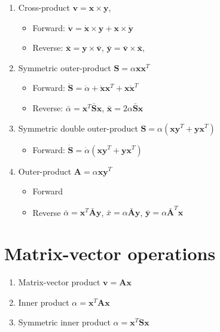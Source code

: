 \documentclass{article}
\begin{document}
\begin{enumerate}
\item Cross-product $\mathbf{v} = \mathbf{x} \times \mathbf{y}$,
\begin{itemize}
\item Forward: $\dot{\mathbf{v}} = \dot{\mathbf{x}} \times \mathbf{y} + \mathbf{x} \times \dot{\mathbf{y}}$
\item Reverse: $\bar{\mathbf{x}} = \mathbf{y} \times \bar{\mathbf{v}}$, $\bar{\mathbf{y}} = \bar{\mathbf{v}} \times \bar{\mathbf{x}}$,
\end{itemize}

\item Symmetric outer-product $\mathbf{S} = \alpha \mathbf{x}\mathbf{x}^{T}$
\begin{itemize}
\item Forward: $\dot{\mathbf{S}} = \dot{\alpha} + \dot{\mathbf{x}} \mathbf{x}^{T} + \mathbf{x} \dot{\mathbf{x}}^{T}$
\item Reverse: $\bar{\alpha} = \mathbf{x}^{T} \bar{\mathbf{S}} \mathbf{x}$, $\bar{\mathbf{x}} = 2 \alpha \bar{\mathbf{S}} \mathbf{x}$
\end{itemize}

\item Symmetric double outer-product $\mathbf{S} = \alpha (\mathbf{x} \mathbf{y}^{T} + \mathbf{y} \mathbf{x}^{T})$
\begin{itemize}
\item Forward: $\dot{\mathbf{S}} = \dot{\alpha}  (\mathbf{x} \mathbf{y}^{T} + \mathbf{y} \mathbf{x}^{T})$
\end{itemize}

\item Outer-product $\mathbf{A} = \alpha \mathbf{x}\mathbf{y}^{T}$
\begin{itemize}
\item Forward
\item Reverse $\bar{\alpha} = \mathbf{x}^{T} \bar{\mathbf{A}} \mathbf{y}$, $\bar{x} = \alpha \bar{\mathbf{A}} \mathbf{y}$, $\bar{\mathbf{y}} = \alpha \bar{\mathbf{A}}^{T} \mathbf{x}$
\end{itemize}

\end{enumerate}

\section{Matrix-vector operations}

\begin{enumerate}
\item Matrix-vector product $\mathbf{v} = \mathbf{A} \mathbf{x}$
\item Inner product $\alpha = \mathbf{x}^{T} \mathbf{A} \mathbf{x}$
\item Symmetric inner product $\alpha = \mathbf{x}^{T} \mathbf{S} \mathbf{x}$
\end{enumerate}
\end{document}
